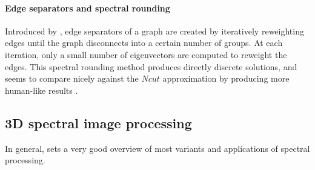 \paragraph{Edge separators and spectral rounding}

Introduced by \cite{tolliver_graph_2006}, edge separators of a graph are created by iteratively reweighting edges until the graph disconnects into a certain number of groups.
At each iteration, only a small number of eigenvectors are computed to reweight the edges.
This spectral rounding method produces directly discrete solutions, and seems to compare nicely against the \(Ncut\) approximation by producing more human-like results \cite{tolliver_spectral_2006}.

\subsection{3D spectral image processing}

In general, \cite{zhang_spectral_2010} sets a very good overview of most variants and applications of spectral processing.
